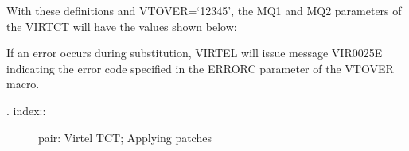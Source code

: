 \documentclass[letterpaper,10pt,english]{sphinxmanual}
\begin{document}
\begin{sphinxVerbatim}[commandchars=\\\{\}]
                          
                                   
                                             
                                     
                       
     
     
\end{sphinxVerbatim}

With these definitions and VTOVER=‘12345’, the MQ1 and MQ2 parameters of the VIRTCT will have the values shown below:

\begin{sphinxVerbatim}[commandchars=\\\{\}]
\end{sphinxVerbatim}

If an error occurs during substitution, VIRTEL will issue message VIR0025E indicating the error code specified in the ERRORC parameter of the VTOVER macro.
\begin{description}
\item[{. index::}] \leavevmode
pair: Virtel TCT; Applying patches

\end{description}
\end{document}
